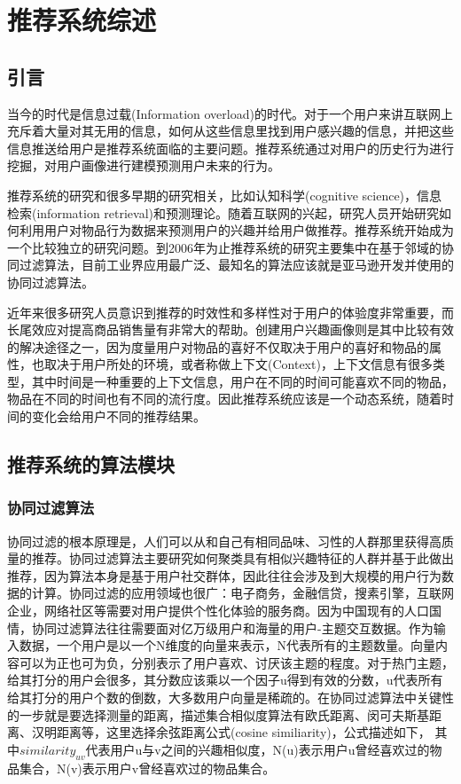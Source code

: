 \chapter{推荐系统综述}

	\section{引言}
		当今的时代是信息过载(Information overload)的时代\citep{info-overload}。对于一个用户来讲互联网上充斥着大量对其无用的信息，如何从这些信息里找到用户感兴趣的信息，并把这些信息推送给用户是推荐系统面临的主要问题。推荐系统通过对用户的历史行为进行挖掘，对用户画像进行建模预测用户未来的行为。

		推荐系统的研究和很多早期的研究相关，比如认知科学(cognitive science)\citep{cognitive-science}，信息检索(information retrieval)和预测理论\citep{Forecast-principle}。随着互联网的兴起，研究人员开始研究如何利用用户对物品行为数据来预测用户的兴趣并给用户做推荐\citep{cf-sn}。推荐系统开始成为一个比较独立的研究问题。到2006年为止推荐系统的研究主要集中在基于邻域的协同过滤算法，目前工业界应用最广泛、最知名的算法应该就是亚马逊开发并使用的协同过滤算法\citep{Amazon-cf}。

		近年来很多研究人员意识到推荐的时效性和多样性对于用户的体验度非常重要，而长尾效应对提高商品销售量有非常大的帮助。创建用户兴趣画像则是其中比较有效的解决途径之一，因为度量用户对物品的喜好不仅取决于用户的喜好和物品的属性，也取决于用户所处的环境，或者称做上下文(Context)，上下文信息有很多类型，其中时间是一种重要的上下文信息，用户在不同的时间可能喜欢不同的物品，物品在不同的时间也有不同的流行度。因此推荐系统应该是一个动态系统，随着时间的变化会给用户不同的推荐结果\citep{temporal-cf}。

	\section{推荐系统的算法模块}
		\subsection{协同过滤算法}
		协同过滤的根本原理是，人们可以从和自己有相同品味、习性的人群那里获得高质量的推荐。协同过滤算法主要研究如何聚类具有相似兴趣特征的人群并基于此做出推荐，因为算法本身是基于用户社交群体，因此往往会涉及到大规模的用户行为数据的计算。协同过滤的应用领域也很广：电子商务，金融信贷，搜素引擎，互联网企业，网络社区等需要对用户提供个性化体验的服务商。因为中国现有的人口国情，协同过滤算法往往需要面对亿万级用户和海量的用户-主题交互数据。作为输入数据，一个用户是以一个N维度的向量来表示，N代表所有的主题数量。向量内容可以为正也可为负，分别表示了用户喜欢、讨厌该主题的程度。对于热门主题，给其打分的用户会很多，其分数应该乘以一个因子u得到有效的分数，u代表所有给其打分的用户个数的倒数，大多数用户向量是稀疏的。在协同过滤算法中关键性的一步就是要选择测量的距离，描述集合相似度算法有欧氏距离、闵可夫斯基距离、汉明距离等，这里选择余弦距离公式(cosine similiarity)，公式描述如下，
		其中$similarity_{uv}$代表用户u与v之间的兴趣相似度，N(u)表示用户u曾经喜欢过的物品集合，N(v)表示用户v曾经喜欢过的物品集合。

